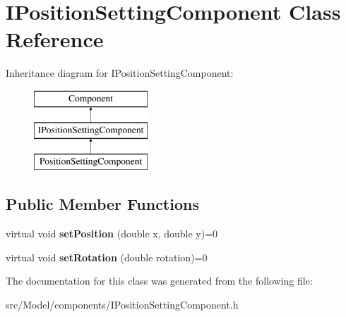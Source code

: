 \hypertarget{classIPositionSettingComponent}{}\section{I\+Position\+Setting\+Component Class Reference}
\label{classIPositionSettingComponent}
Inheritance diagram for I\+Position\+Setting\+Component\+:\begin{figure}[H]
\begin{center}
\leavevmode
\includegraphics[height=3.000000cm]{classIPositionSettingComponent}
\end{center}
\end{figure}
\subsection*{Public Member Functions}
\begin{DoxyCompactItemize}
\item 
virtual void {\bfseries set\+Position} (double x, double y)=0\hypertarget{classIPositionSettingComponent_afe7a48fe87229989acf9b216b0750146}{}\label{classIPositionSettingComponent_afe7a48fe87229989acf9b216b0750146}

\item 
virtual void {\bfseries set\+Rotation} (double rotation)=0\hypertarget{classIPositionSettingComponent_a82e7bd02180b7c039ff9b75afdbd89f3}{}\label{classIPositionSettingComponent_a82e7bd02180b7c039ff9b75afdbd89f3}

\end{DoxyCompactItemize}


The documentation for this class was generated from the following file\+:\begin{DoxyCompactItemize}
\item 
src/\+Model/components/I\+Position\+Setting\+Component.\+h\end{DoxyCompactItemize}
